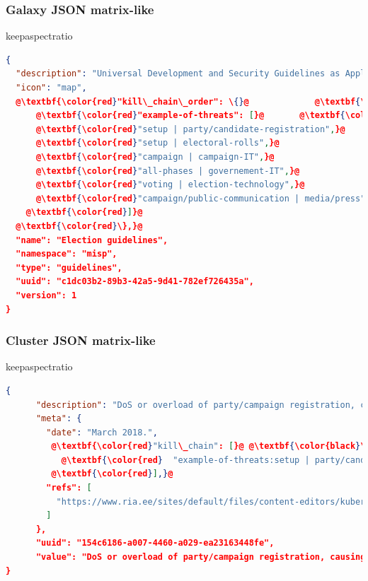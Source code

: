 \begin{frame}[fragile]
        \frametitle{Galaxy JSON matrix-like}
        \begin{adjustbox}{keepaspectratio}
            \begin{lstlisting}[language=json,firstnumber=1,escapechar=@]
        {
  "description": "Universal Development and Security Guidelines as Applicable to Election Technology.",
  "icon": "map",
  @\textbf{\color{red}"kill\_chain\_order": \{}@             @\textbf{\color{black}\textbackslash\textbackslash Tab in the matrix}@
      @\textbf{\color{red}"example-of-threats": [}@       @\textbf{\color{black}\textbackslash\textbackslash Column in the matrix}@
      @\textbf{\color{red}"setup | party/candidate-registration",}@
      @\textbf{\color{red}"setup | electoral-rolls",}@
      @\textbf{\color{red}"campaign | campaign-IT",}@
      @\textbf{\color{red}"all-phases | governement-IT",}@
      @\textbf{\color{red}"voting | election-technology",}@
      @\textbf{\color{red}"campaign/public-communication | media/press"}@
    @\textbf{\color{red}]}@
  @\textbf{\color{red}\},}@
  "name": "Election guidelines",
  "namespace": "misp",
  "type": "guidelines",
  "uuid": "c1dc03b2-89b3-42a5-9d41-782ef726435a",
  "version": 1
}
        \end{lstlisting}
        \end{adjustbox}
\end{frame}

\begin{frame}[fragile]
        \frametitle{Cluster JSON matrix-like}
        \begin{adjustbox}{keepaspectratio}
            \begin{lstlisting}[language=json,firstnumber=1, escapechar=@]
{
      "description": "DoS or overload of party/campaign registration, causing them to miss the deadline",
      "meta": {
        "date": "March 2018.",
         @\textbf{\color{red}"kill\_chain": [}@ @\textbf{\color{black}\textbackslash\textbackslash Define in which column the cluster should be placed}@
           @\textbf{\color{red}  "example-of-threats:setup | party/candidate-registration"}@
         @\textbf{\color{red}],}@
        "refs": [
          "https://www.ria.ee/sites/default/files/content-editors/kuberturve/cyber_security_of_election_technology.pdf"
        ]
      },
      "uuid": "154c6186-a007-4460-a029-ea23163448fe",
      "value": "DoS or overload of party/campaign registration, causing them to miss the deadline"
}
        \end{lstlisting}
        \end{adjustbox}
\end{frame}



